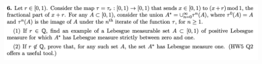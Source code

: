 



\newpage
\begin{mdframed}
  \includegraphics[width=400pt]{img/analysis--berkeley-202a-hw06-9bc5.png}
\end{mdframed}








